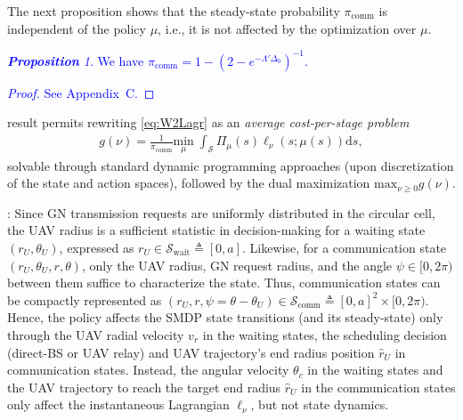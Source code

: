 \documentclass[12pt, draftcls, onecolumn]{IEEEtran}
\theoremstyle{plain}
\theoremstyle{definition}
\theoremstyle{remark}
\newtheorem{prop}{\textbf{Proposition}}
\newcommand\hlt[1]{\textcolor{blue}{#1}}
\begin{document}
The next proposition shows that the steady-state probability $\pi_{\mathrm{comm}}$ is independent of the policy $\mu$, i.e., it is not affected by the optimization over $\mu$.
\hlt{\begin{prop}\label{P3}
We have
$\pi_{\mathrm{comm}}{=}1-(2{-}e^{-\Lambda'\Delta_{0}})^{-1}$.
\end{prop}
\begin{proof}    See Appendix~C.\end{proof}
}
 result permits rewriting \eqref{eq:W2Lagr} as an \emph{average cost-per-stage problem}
\begin{align}\label{eq:TotalGMin}
	g(\nu) = \frac{1}{\pi_{\mathrm{comm}}}\underset{\mu}{\mathrm{min}} \; \int_{\mathcal{S}} \Pi_{\mu}(s) \ell_\nu(s; \mu(s))\mathrm d s,
\end{align}
solvable through standard dynamic programming approaches (upon discretization of the state and action spaces), followed by the dual maximization $\mathrm{max}_{\nu{\geq}0}g(\nu)$.

: Since GN transmission requests are uniformly distributed in the circular cell, the UAV radius is a sufficient statistic in decision-making for a waiting state $(r_{U},\theta_{U})$, expressed as $r_{U}{\in}\mathcal{S}_{\mathrm{wait}}\triangleq[0,a]$. Likewise, for a communication state $(r_{U},\theta_{U},r,\theta)$, only the UAV radius, GN request radius, and the angle $\psi{\in}[0,2\pi)$ between them suffice to characterize the state. Thus, communication states can be compactly represented as $(r_{U},r,\psi{=}\theta{-}\theta_U){\in}\mathcal{S}_{\mathrm{comm}}\triangleq[0,a]^2{\times}[0, 2\pi)$. Hence, the policy affects the SMDP state transitions (and its steady-state) only through the UAV radial velocity $v_{r}$ in the waiting states, the
scheduling decision (direct-BS or UAV relay) and
 UAV trajectory's end radius position $\hat{r}_{U}$ in communication states. Instead, the angular velocity $\theta_{c}$ in the waiting states and the UAV trajectory to reach the target end radius $\hat{r}_{U}$ in the communication states
  only affect the instantaneous Lagrangian $\ell_{\nu}$, but not
 state dynamics.
\end{document}
